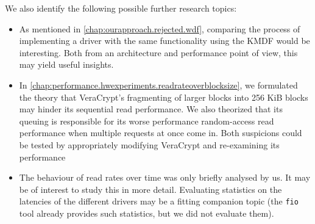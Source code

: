 We also identify the following possible further research topics:
\begin{itemize}
	\item As mentioned in \autoref{chap:ourapproach.rejected.wdf}, comparing the process of implementing a driver with the same functionality using the KMDF would be interesting. Both from an architecture and performance point of view, this may yield useful insights.
	\item In \autoref{chap:performance.hwexperiments.readrateoverblocksize}, we formulated the theory that VeraCrypt's fragmenting of larger blocks into 256 KiB blocks may hinder its sequential read performance. We also theorized that its queuing is responsible for its worse performance random-access read performance when multiple requests at once come in. Both suspicions could be tested by appropriately modifying VeraCrypt and re-examining its performance
	\item The behaviour of read rates over time was only briefly analysed by us. It may be of interest to study this in more detail. Evaluating statistics on the latencies of the different drivers may be a fitting companion topic (the \texttt{fio} tool already provides such statistics, but we did not evaluate them).
\end{itemize}


